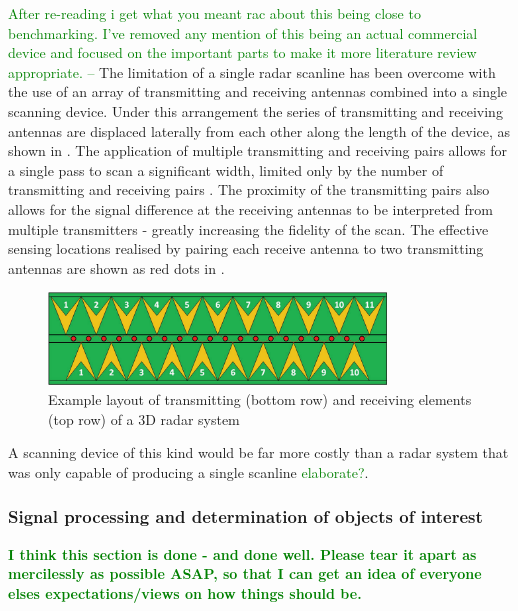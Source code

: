 \documentclass[main.tex]{subfiles}
\begin{document}
\textcolor{green}{After re-reading i get what you meant rac about this being close to benchmarking. I've removed any mention of this being an actual commercial device and focused on the important parts to make it more literature review appropriate. --}
The limitation of a single radar scanline has been overcome with the use of an array of transmitting and receiving antennas combined into a single scanning device. Under this arrangement the series of transmitting and receiving antennas are displaced laterally from each other along the length of the device, as shown in . The application of multiple transmitting and receiving pairs allows for a single pass to scan a significant width, limited only by the number of transmitting and receiving pairs \parencite{3dradarDX}. The proximity of the transmitting pairs also allows for the signal difference at the receiving antennas to be interpreted from multiple transmitters - greatly increasing the fidelity of the scan. The effective sensing locations realised by pairing each receive antenna to two transmitting antennas are shown as red dots in .
\begin{figure}[ht]
\includegraphics[width=0.8\textwidth]{3-LiteratureReview/3d-radar.png}
\centering
\caption[Example layout of transmitting (bottom row) and receiving elements (top row) of a 3D radar system]{Example layout of transmitting (bottom row) and receiving elements (top row) of a 3D radar system \parencite{3dradarDXG}} 
\end{figure}
A scanning device of this kind would be far more costly than a radar system that was only capable of producing a single scanline \textcolor{green}{elaborate?}.

\subsubsection{Signal processing and determination of objects of interest}
\textbf{\textcolor{green}{I think this section is done - and done well. Please tear it apart as mercilessly as possible ASAP, so that I can get an idea of everyone elses expectations/views on how things should be.}}
\end{document}
